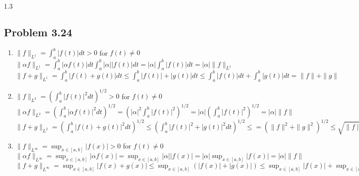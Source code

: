 \documentclass[letterpaper,12pt]{article}
\theoremstyle{definition}
\begin{document}
\begin{spacing}{1.3}{}
	
\subsection*{Problem 3.24}
	\begin{enumerate}
	\item 
	$\|f\|_{L^{1}} = \int_{a}^{b} |f(t)|dt >0$ for $f(t) \neq 0$ \\
	
	$\|\alpha f\|_{L^{1}} = \int_{a}^{b} |\alpha f(t)|dt \int_{a}^{b} |\alpha| |f(t)|dt = |\alpha| \int_{a}^{b} |f(t)|dt = |\alpha| \|f\|_{L^{1}}$ \\
	
	$\|f+g\|_{L^{1}} = \int_{a}^{b} |f(t)+g(t)|dt \leq \int_{a}^{b} |f(t)|+|g(t)|dt \leq \int_{a}^{b}|f(t)|dt + \int_{a}^{b}|g(t)|dt = \|f\| + \|g\| $ \\
	\item
	
	
	$\|f\|_{L^{2}} = (\int_{a}^{b} |f(t)|^{2}dt)^{1/2} >0$ for $f(t) \neq 0$ \\
	
	$\|\alpha f\|_{L^{2}} = (\int_{a}^{b} |\alpha f(t)|^{2}dt)^{1/2} = ( |\alpha|^2 \int_{a}^{b} |f(t)|^{2})^{1/2} = |\alpha|(\int_{a}^{b} |f(t)|^{2})^{1/2} = |\alpha| \|f\| $\\
	
	$\|f+g\|_{L^{2}} = (\int_{a}^{b} |f(t)+g(t)|^2 dt)^{1/2} \leq (\int_{a}^{b} |f(t)|^2+|g(t)|^2 dt)^{1/2} \leq = (\|f\|^2 + \|g\|^2)^{1/2} \leq \sqrt{\|f\|^2} + \sqrt{\|g\|^2} = \|f\|+\|g\|  $ \\
	\item
	
	$\|f\|_{L^{\infty}} = \sup_{x \in [a,b]} |f(x)| >0$ for $f(t) \neq 0$ \\
	
	$\|\alpha f\|_{L^{\infty}} = \sup_{x \in [a,b]} |\alpha f(x)| = \sup_{x \in [a,b]} |\alpha| |f(x)| = |\alpha| \sup_{x \in [a,b]} |f(x)| = |\alpha| \|f\|$\\
	
	$\|f+g\|_{L^{\infty}} = \sup_{x \in [a,b]} |f(x)+g(x)| \leq \sup_{x \in [a,b]} (|f(x)|+|g(x)|) \leq \sup_{x \in [a,b]} |f(x)| + \sup_{x \in [a,b]} |g(x)| = \|f\| + \|g\| $ \
	
	\end{enumerate}
	

\end{spacing}
\end{document}
